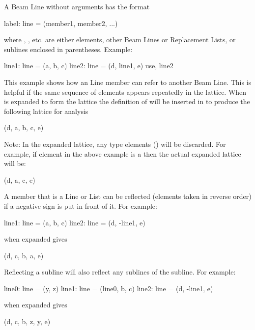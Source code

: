A Beam Line without arguments has the format
\begin{example}
  label: line = (member1, member2, ...)
\end{example}
where , , etc. are either elements, other Beam
Lines or Replacement Lists, or sublines enclosed in parentheses.
Example:
\begin{example}
  line1: line = (a, b, c)
  line2: line = (d, line1, e)
  use, line2
\end{example}
This example shows how an Line member can refer to another Beam Line.
This is helpful if the same sequence of elements appears repeatedly in
the lattice. When  is expanded to form the lattice the
definition of  will be inserted in to produce the following
lattice for analysis
\begin{example}
  (d, a, b, c, e)
\end{example}
Note: In the expanded lattice, any  type elements
() will be discarded. For example, if element 
in the above example is a  then the actual expanded
lattice will be:
\begin{example}
  (d, a, c, e)
\end{example}

A member that is a Line or List can be reflected 
(elements taken in reverse order) if
a negative sign is put in front of it. For example:
\begin{example}
  line1: line = (a, b, c)
  line2: line = (d, -line1, e)
\end{example}
 when expanded gives
\begin{example}
  (d, c, b, a, e)
\end{example}
Reflecting a subline will also reflect any sublines of the subline. For
example:
\begin{example}
  line0: line = (y, z)
  line1: line = (line0, b, c)
  line2: line = (d, -line1, e)
\end{example}
 when expanded gives
\begin{example}
  (d, c, b, z, y, e)
\end{example}

